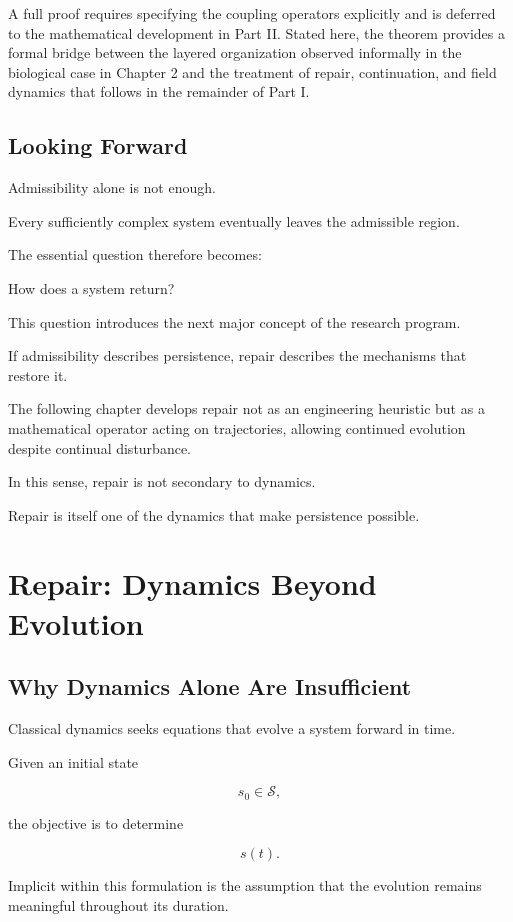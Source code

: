 \documentclass[11pt,oneside]{book}
\numberwithin{equation}{chapter}
\theoremstyle{definition}
\theoremstyle{plain}
\newcommand{\State}{\mathcal{S}}
\begin{document}
A full proof requires specifying the coupling operators explicitly and is
deferred to the mathematical development in Part II. Stated here, the
theorem provides a formal bridge between the layered organization observed
informally in the biological case in Chapter 2 and the treatment of repair,
continuation, and field dynamics that follows in the remainder of Part I.

\section{Looking Forward}

Admissibility alone is not enough.

Every sufficiently complex system eventually leaves the admissible region.

The essential question therefore becomes:

How does a system return?

This question introduces the next major concept of the research program.

If admissibility describes persistence, repair describes the mechanisms
that restore it.

The following chapter develops repair not as an engineering heuristic but as
a mathematical operator acting on trajectories, allowing continued evolution
despite continual disturbance.

In this sense, repair is not secondary to dynamics.

Repair is itself one of the dynamics that make persistence possible.

\chapter{Repair: Dynamics Beyond Evolution}

\section{Why Dynamics Alone Are Insufficient}

Classical dynamics seeks equations that evolve a system forward in time.

Given an initial state

\[
s_0 \in \State,
\]

the objective is to determine

\[
s(t).
\]

Implicit within this formulation is the assumption that the evolution
remains meaningful throughout its duration.
\end{document}
